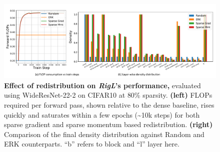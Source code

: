 \begin{figure}[!ht]
    \centering
    \includegraphics[width=1\textwidth]{../openreview/figs/density_dist_evolution.pdf}
    \captionsetup{aboveskip=\figureaboveskip,belowskip=\figurebelowskip}
    \caption{\textbf{Effect of redistribution on \textit{RigL}'s performance,} evaluated using WideResNet-22-2 on CIFAR10 at 80\% sparsity. \textbf{(left)} FLOPs required per forward pass, shown relative to the dense baseline, rises quickly and saturates within a few epochs (\textasciitilde10k steps) for both sparse gradient and sparse momentum based redistribution. \textbf{(right)} Comparison of the final density distribution against Random and ERK counterparts. ``b'' refers to block and ``l'' layer here.}
    \label{fig:density-dist-evolution}
\end{figure}